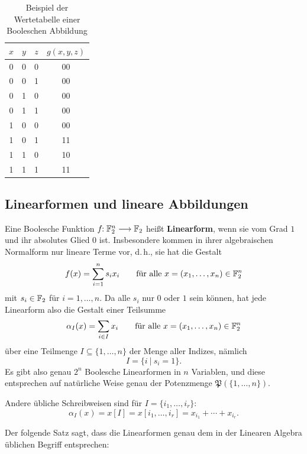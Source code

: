 \begin{refsegment}
\begin{table}[hbpt]
\begin{center}
\begin{tabular}{|ccc|c|} \hline
   $x$ & $y$ & $z$ & $g(x,y,z)$ \\ \hline
    0  &  0  &  0  &  00  \\
    0  &  0  &  1  &  00  \\
    0  &  1  &  0  &  00  \\
    0  &  1  &  1  &  00  \\
    1  &  0  &  0  &  00  \\
    1  &  0  &  1  &  11  \\
    1  &  1  &  0  &  10  \\
    1  &  1  &  1  &  11  \\
   \hline
\end{tabular}
\end{center}
\caption{Beispiel der Wertetabelle einer Booleschen Abbildung}\label{tab-bool-wta}
\end{table}

\subsection{Linearformen und lineare Abbildungen}\label{ss-bool-lin}

Eine Boolesche Funktion $f\!\!: \mathbb{F}_2^n \longrightarrow \mathbb{F}_2$ heißt
\textbf{Linearform}, wenn sie vom Grad $1$ und ihr absolutes Glied $0$ ist.
Insbesondere kommen in ihrer algebraischen Normalform nur lineare
Terme vor, d.\,h., sie hat die Gestalt
\[
  f(x) = \sum_{i=1}^n s_i x_i \qquad\textrm{für alle }
  x = (x_1,\ldots,x_n) \in \mathbb{F}_2^n
\]
mit $s_i \in \mathbb{F}_2$ für $i = 1, \ldots, n$. Da alle $s_i$ nur $0$ oder $1$
sein können, hat jede Linearform also die Gestalt einer Teilsumme
\[
  \alpha_I(x) = \sum_{i\in I} x_i \qquad\textrm{für alle }
  x = (x_1,\ldots,x_n) \in \mathbb{F}_2^n
\]
über eine Teilmenge $I \subseteq \{1,\ldots,n\}$
der Menge aller Indizes, nämlich
\[
     I = \{i \:|\: s_i = 1\}.
\]
Es gibt also genau $2^n$ Boolesche
Linearformen in $n$ Variablen, und diese entsprechen auf natürliche
Weise genau der Potenzmenge $\mathfrak{P}(\{1,\ldots,n\})$.

Andere übliche Schreibweisen sind für $I = \{i_1,\ldots,i_r\}$:
\[
  \alpha_I(x) = x[I] = x[i_1,\ldots,i_r] = x_{i_1} + \cdots + x_{i_r}.
\]

Der folgende Satz sagt, dass die Linearformen genau dem in der
Linearen Algebra üblichen Begriff entsprechen:


\end{refsegment}
